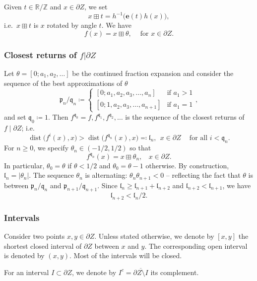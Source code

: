 \documentclass{amsart}
\renewcommand{\sp}{{\ \ }}
\newcommand{\1}{{\mathbb 1 }}
\newcommand{\pp}{\mathfrak{p}}
\newcommand{\ee}{\mathbf e}
\newcommand{\qq}{\mathfrak{q}}
\newcommand{\length}{{\mathfrak l}}
\newcommand{\R}{\mathbb{R}}
\newcommand{\Z}{\mathbb{Z}}
\theoremstyle{remark}
\numberwithin{equation}{section}
\theoremstyle{definition}
\newcommand{\dist}{\operatorname{dist}}
\begin{document}
Given $t\in \R/\Z$ and $x\in \partial Z$, we set 
\[x\boxplus t = h ^{-1} \big( \ee(t) h(x)\big),\]
i.e.~$x\boxplus t$ is $x$ rotated by angle $t$. We have
\[ f(x)=x\boxplus \theta ,\sp\sp \text{ for }x\in\partial Z.\]


\subsubsection{Closest returns of $ f| \partial Z$}
\label{sss:closest returns}
Let $\theta=[0;a_1,a_2,\dots ]$ be the continued fraction expansion and consider the sequence of the best approximations of $\theta$
\[\pp_n/\qq_n\coloneqq \left\{ 
\begin{array}{cc}
[0;a_1,a_2,a_3,\dots, a_n] & \text{if }a_1>1\\{} 
[0;1,a_2,a_3,\dots, a_{n+1}] & \text{if }a_1=1
\end{array}
\right.,\]and set $\qq_0\coloneqq 1$. Then $f^{\qq_0}=f,f^{\qq_1},f^{\qq_2},\dots$ is the sequence of the closest returns of $f\mid \partial Z$; i.e.
\[ \dist \big( f^i (x),x\big) >\dist \big( f^{\qq_n} (x),x\big)\eqqcolon \length_n, \sp x\in \partial Z\sp\sp \text{ for all }i<\qq_n.\]
For $n\ge 0$, we specify $\theta_n\in (-1/2,1/2)$ so that
\[ f^{\qq_n} (x)= x\boxplus \theta_n, \sp\sp x\in \partial Z.\]
In particular, $\theta_0=\theta$ if $\theta <1/2$ and $\theta_0=\theta-1$ otherwise. By construction, $\length_n=|\theta_n|$. The sequence $\theta_n$ is alternating: $\theta_n\theta_{n+1}<0$ -- reflecting the fact that $\theta$ is between $\pp_{n}/\qq_{n}$ and $ \pp_{n+1}/\qq_{n+1}.$ Since $\length_{n}\ge \length_{n+1}+\length_{n+2}$ and $\length_{n+2}<\length_{n+1}$, we have
\begin{equation}
\label{eq:length decrease}
\length_{n+2} < \length_n/2.
\end{equation}

 

 




\subsubsection{Intervals} Consider two points $x,y\in \partial Z$. Unless stated otherwise, we denote by $[x,y]$ the shortest closed interval of $\partial Z$ between $x$ and $y$. The corresponding  open interval is denoted by $(x,y)$. Most of the intervals will be closed. 


For an interval $I\subset \partial Z$, we denote by $I^c=\overline {\partial Z\setminus I}$ its complement. 
\end{document}
